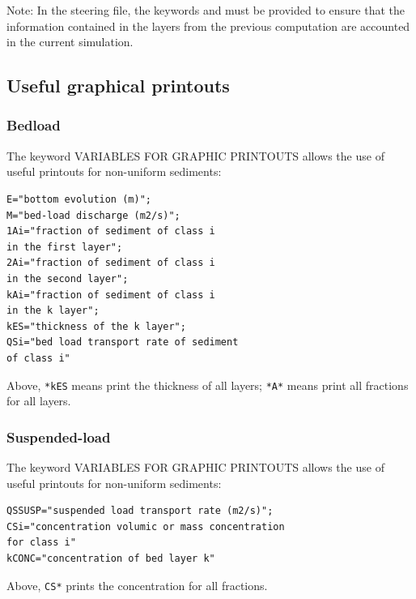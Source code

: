 \begin{WarningBlock}{Note:}
In the \sisyphe steering file, the keywords  and  must be provided
to ensure that the information contained in the layers from the previous computation are accounted in the current simulation.
\end{WarningBlock}
  


\subsection{Useful graphical printouts}
\subsubsection{Bedload}
The keyword {\ttfamily VARIABLES FOR GRAPHIC PRINTOUTS} allows the use of useful printouts for non-uniform sediments:
\begin{lstlisting}[frame=trBL]   
E="bottom evolution (m)";
M="bed-load discharge (m2/s)";
1Ai="fraction of sediment of class i 
in the first layer";
2Ai="fraction of sediment of class i 
in the second layer";
kAi="fraction of sediment of class i 
in the k layer";
kES="thickness of the k layer";
QSi="bed load transport rate of sediment 
of class i"
\end{lstlisting}
Above, \texttt{*kES} means print the thickness of all layers; \texttt{*A*} means print all fractions for all layers.

\subsubsection{Suspended-load}
The keyword {\ttfamily VARIABLES FOR GRAPHIC PRINTOUTS} allows the use of useful printouts for non-uniform sediments:
\begin{lstlisting}[frame=trBL]   
QSSUSP="suspended load transport rate (m2/s)";
CSi="concentration volumic or mass concentration 
for class i"
kCONC="concentration of bed layer k"
\end{lstlisting}
Above, \texttt{CS*} prints the concentration for all fractions.


